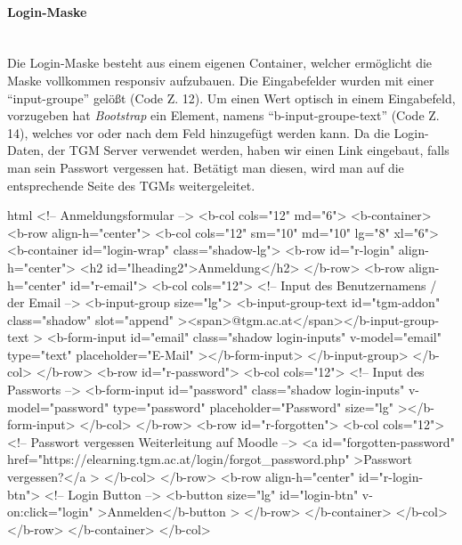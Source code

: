 \paragraph{Login-Maske}
~\\
Die Login-Maske besteht aus einem eigenen Container, welcher ermöglicht die Maske vollkommen responsiv aufzubauen. Die Eingabefelder wurden mit einer \enquote{input-groupe} gelößt (Code Z. 12). Um einen Wert optisch in einem Eingabefeld, vorzugeben hat \textit{Bootstrap} ein Element, namens \enquote{b-input-groupe-text} (Code Z. 14), welches vor oder nach dem Feld hinzugefügt werden kann. Da die Login-Daten, der TGM Server verwendet werden, haben wir einen Link eingebaut, falls man sein Passwort vergessen hat. Betätigt man diesen, wird man auf die entsprechende Seite des TGMs weitergeleitet.
\begin{code}{html}
	<!-- Anmeldungsformular -->
	<b-col cols="12" md="6">
		<b-container>
			<b-row align-h="center">
				<b-col cols="12" sm="10" md="10" lg="8" xl="6">
					<b-container id="login-wrap" class="shadow-lg">
						<b-row id="r-login" align-h="center">
							<h2 id="lheading2">Anmeldung</h2>
						</b-row>
						<b-row align-h="center" id="r-email">
							<b-col cols="12">
								<!-- Input des Benutzernamens / der Email -->
								<b-input-group size="lg">
									<b-input-group-text
										id="tgm-addon"
										class="shadow"
										slot="append"
										><span>@tgm.ac.at</span></b-input-group-text
										>
									<b-form-input
										id="email"
										class="shadow login-inputs"
										v-model="email"
										type="text"
										placeholder="E-Mail"
									></b-form-input>
								</b-input-group>
							</b-col>
						</b-row>
						<b-row id="r-password">
							<b-col cols="12">
								<!-- Input des Passworts -->
								<b-form-input
									id="password"
									class="shadow login-inputs"
									v-model="password"
									type="password"
									placeholder="Password"
									size="lg"
								></b-form-input>
							</b-col>
						</b-row>
						<b-row id="r-forgotten">
							<b-col cols="12">
								<!-- Passwort vergessen Weiterleitung auf Moodle -->
								<a
									id="forgotten-password"
									href="https://elearning.tgm.ac.at/login/forgot_password.php"
								>Passwort vergessen?</a
								>
							</b-col>
						</b-row>
						<b-row align-h="center" id="r-login-btn">
							<!-- Login Button -->
							<b-button size="lg" id="login-btn" v-on:click="login"
							>Anmelden</b-button
							>
						</b-row>
					</b-container>
				</b-col>
			</b-row>
		</b-container>
	</b-col>
\end{code}
